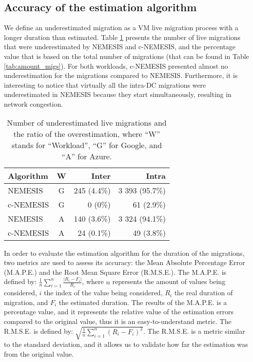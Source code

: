  \subsection{Accuracy of the estimation algorithm}
 
We define an underestimated migration as a VM live migration process with a longer duration than estimated. Table \ref{tab:migs_under} presents the number of live migrations that were underestimated by NEMESIS and c-NEMESIS, and the percentage value that is based on the total number of migrations (that can be found in Table \ref{tab:amount_migs}). For both workloads, c-NEMESIS presented almost no underestimation for the migrations compared to NEMESIS. Furthermore, it is interesting to notice that virtually all the intra-DC migrations were underestimated in NEMESIS because they start simultaneously, resulting in network congestion.

\begin{table}[!ht]
\caption{Number of underestimated live migrations and the ratio of the overestimation, where ``W'' stands for ``Workload'', ``G'' for Google, and ``A'' for Azure.}\label{tab:migs_under} \centering
\begin{tabular}{|l|c|r|r|}
  \hline
  \textbf{Algorithm} & \textbf{W}  & \textbf{Inter} & \textbf{Intra}   \\
  \hline
  NEMESIS  & G & 245 (4.4\%)   & 3 393 (95.7\%) \\
  \hline
  c-NEMESIS & G & 0 (0\%)  & 61 (2.9\%) \\
  \hline
  NEMESIS & A & 140 (3.6\%)   &  3 324 (94.1\%)   \\
  \hline
  c-NEMESIS & A & 24 (0.1\%)   & 49 (3.8\%) \\
  \hline  
\end{tabular}
\end{table}


In order to evaluate the estimation algorithm for the duration of the migrations, two metrics are used to assess its accuracy: the Mean Absolute Percentage Error (M.A.P.E.) and the Root Mean Square Error (R.M.S.E.). The M.A.P.E. is defined by: $ \frac{1}{n}\sum_{i=1}^{n}  \frac{| R_{i} - F_{i}|}{R_{i}}$, where $n$ represents the amount of values being considered, $i$ the index of the value being considered, $R_{i}$ the real duration of migration, and $F_{i}$ the estimated duration. The results of the M.A.P.E. is a percentage value, and it represents the relative value of the estimation errors compared to the original value, thus it is an easy-to-understand metric. The R.M.S.E. is defined by: $\sqrt{ \frac{1}{n}\sum_{i=1}^{n}  (R_{i} - F_{i})^2}$. The R.M.S.E. is a metric similar to the standard deviation, and it allows us to validate how far the estimation was from the original value.


